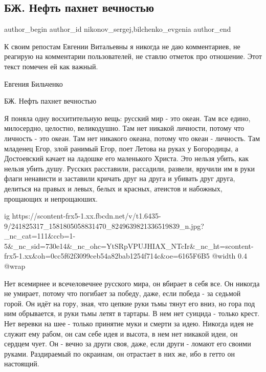  
 
 
 
 
 
\subsection{БЖ. Нефть пахнет вечностью}
\label{sec:15_09_2021.fb.nikonov_sergej.1.bilchenko_rusmir_neft_vechnost}
 
\ifcmt
 author_begin
   author_id nikonov_sergej,bilchenko_evgenia
 author_end
\fi

К своим репостам Евгении Витальевны я никогда не даю комментариев, не реагирую
на комментарии пользователей, не ставлю отметок про отношение. Этот текст
помечен ей как важный.

Евгения Бильченко

БЖ. Нефть пахнет вечностью

Я поняла одну восхитительную вещь: русский мир - это океан. Там все едино,
милосердно, целостно, великодушно. Там нет никакой личности, потому что
личность - это океан. Там нет никакого океана, потому что океан - личность. Там
младенец Егор, злой ранимый Егор, поет Летова на руках у Богородицы, а
Достоевский качает на ладошке его маленького Христа. Это нельзя убить, как
нельзя убить душу. Русских расставили, рассадили, развели, вручили им в руки
флаги ненависти и заставили кричать друг на друга и убивать друг друга,
делиться на правых и левых, белых и красных, атеистов и набожных, прощающих и
непрощаюших.

\ifcmt
  ig https://scontent-frx5-1.xx.fbcdn.net/v/t1.6435-9/241825317_1581805058831470_8249639821336519839_n.jpg?_nc_cat=111&ccb=1-5&_nc_sid=730e14&_nc_ohc=YtSRpVPUJHIAX_NTcIr&_nc_ht=scontent-frx5-1.xx&oh=0cc5f62f3099ceb54a82bab1254f714c&oe=6165F6B5
  @width 0.4
  @wrap 
\fi

Нет всемирнее и всечеловечнее русского мира, он вбирает в себя все. Он никогда
не умирает, потому что погибает за победу, даже, если победа - за седьмой
горой. Он идёт на гору, зная, что цепкие руки тьмы тянут его вниз, но гора под
ним обрывается, и руки тьмы летят в тартары. В нем нет суицида - только крест.
Нет веревки на шее - только принятие муки и смерти за идею. Никогда идея не
служит ему рабом, он сам себе идея и высота, в нем нет никакой идеи, он сердцем
чует. Он - вечно за други своя, даже, если други - ломают его своими руками.
Раздираемый по окраинам, он отрастает в них же, ибо в гетто он настоящий.

